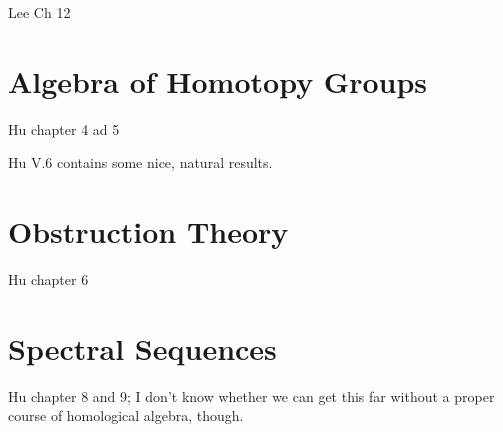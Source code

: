 \documentclass[oneside,english]{amsbook}
\numberwithin{section}{chapter}
\theoremstyle{plain}
\theoremstyle{definition}
\begin{document}
	Lee Ch 12

	\chapter{Algebra of Homotopy Groups}	

	Hu chapter 4 ad 5
	
	Hu V.6 contains some nice, natural results.

	\chapter{Obstruction Theory}	

	Hu chapter 6

	\chapter{Spectral Sequences}	

	Hu chapter 8 and 9; I don't know whether we can get this far without a proper course of homological algebra, though.
\end{document}
